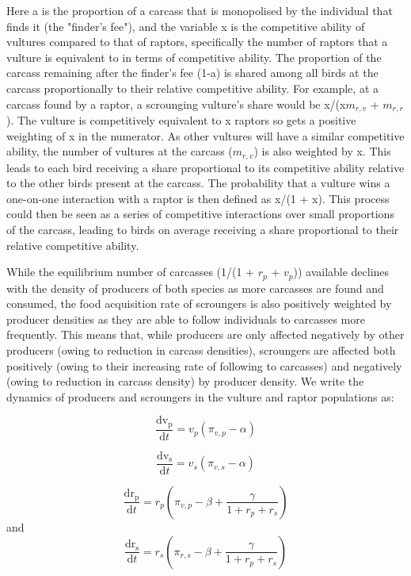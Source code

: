 Here a is the proportion of a carcass that is monopolised by the individual that finds it (the "finder's fee"), and the variable x is the competitive ability of vultures compared to that of raptors, specifically the number of raptors that a vulture is equivalent to in terms of competitive ability. The proportion of the carcass remaining after the finder's fee (1-a) is shared among all birds at the carcass proportionally to their relative competitive ability. For example, at a carcass found by a raptor, a scrounging vulture's share would be x/(x$m_{r,v}$ + $m_{r,r}$). The vulture is competitively equivalent to x raptors so gets a positive weighting of x in the numerator. As other vultures will have a similar competitive ability, the number of vultures at the carcass ($m_{r,v}$) is also weighted by x. This leads to each bird receiving a share proportional to its competitive ability relative to the other birds present at the carcass. The probability that a vulture wins a one-on-one interaction with a raptor is then defined as x/(1 + x). This process could then be seen as a series of competitive interactions over small proportions of the carcass, leading to birds on average receiving a share proportional to their relative competitive ability.

While the equilibrium number of carcasses (1/(1 + $r_p$ + $v_p$)) available declines with the density of producers of both species as more carcasses are found and consumed, the food acquisition rate of scroungers is also positively weighted by producer densities as they are able to follow individuals to carcasses more frequently. This means that, while producers are only affected negatively by other producers (owing to reduction in carcass densities), scroungers are affected both positively (owing to their increasing rate of following to carcasses) and negatively (owing to reduction in carcass density) by producer density. 
We write the dynamics \citep{hofbauer2003evolutionary} of producers and scroungers in the vulture and raptor populations as:

\begin{equation}
\frac{\mathrm{dv_{p}} }{\mathrm{d} t} = v_{p}\left ( \pi _{v,p}- \alpha \right )
\end{equation}

\begin{equation}
\frac{\mathrm{dv_{s}} }{\mathrm{d} t} = v_{s}\left ( \pi _{v,s}- \alpha \right )
\end{equation}

\begin{equation}
\frac{\mathrm{dr_{p}} }{\mathrm{d} t} = r_{p}\left ( \pi _{v,p}- \beta + \frac{\gamma }{1+r_{p} +r_{s}}\right )
\end{equation}
and
\begin{equation}
\frac{\mathrm{dr_{s}} }{\mathrm{d} t} = r_{s}\left ( \pi _{r,s}- \beta + \frac{\gamma }{1+r_{p} +r_{s}}\right )
\end{equation}


